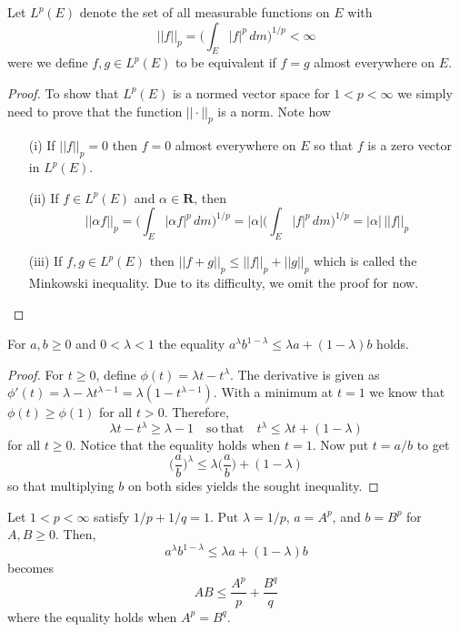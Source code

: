 \vspace{2ex}
\begin{cor}
Let $L^{p}(E)$ denote the set of all measurable functions on $E$ with 
\[||f||_{p}=\Big(\int _{E}|f|^{p}\,dm\Big)^{1/p}<\infty \]
were we define $f,g\in L^{p}(E)$ to be equivalent if $f=g$ almost everywhere on $E$. 
\end{cor}
\vspace{2ex}
\begin{proof}
To show that $L^{p}(E)$ is a normed vector space for $1<p<\infty $ we simply need to prove that the function $||\cdot ||_{p}$ is a norm. Note how
\begin{itemize}
\item[(i)] If $||f||_{p}=0$ then $f=0$ almost everywhere on $E$ so that $f$ is a zero vector in $L^{p}(E)$.
\item[(ii)] If $f\in L^{p}(E)$ and $\alpha \in {\bm R}$, then 
\[||\alpha f||_{p}=\Big(\int _{E}|\alpha f|^{p}\,dm\Big)^{1/p}=|\alpha |\Big(\int _{E}|f|^{p}\,dm\Big)^{1/p}=|\alpha |\,||f||_{p}\]
\item[(iii)] If $f,g\in L^{p}(E)$ then $||f+g||_{p}\leq ||f||_{p}+||g||_{p}$ which is called the Minkowski inequality. Due to its difficulty, we omit the proof for now.
\end{itemize}
\end{proof}
\vspace{2ex}
\begin{lem}
For $a,b\geq 0$ and $0<\lambda <1$ the equality $a^{\lambda }b^{1-\lambda }\leq \lambda a+(1-\lambda )b$ holds.
\end{lem}
\vspace{2ex}
\begin{proof}
For $t\geq 0$, define $\phi (t)=\lambda t-t^{\lambda }$. The derivative is given as $\phi '(t)=\lambda -\lambda t^{\lambda -1}=\lambda (1-t^{\lambda -1})$. With a minimum at $t=1$ we know that $\phi (t)\geq \phi (1)$ for all $t>0$. Therefore,
\[\lambda t-t^{\lambda }\geq \lambda -1\quad\mathrm{so\ that}\quad t^{\lambda }\leq \lambda t+(1-\lambda )\]
for all $t\geq 0$. Notice that the equality holds when $t=1$. Now put $t=a/b$ to get 
\[\Big(\dfrac{a}{b}\Big)^{\lambda  }\leq \lambda\Big(\dfrac{a}{b}\Big)+(1-\lambda )\]
so that multiplying $b$ on both sides yields the sought inequality.
\end{proof}
\vspace{2ex}
\begin{cor}
Let $1<p<\infty $ satisfy $1/p+1/q=1$. Put $\lambda =1/p$, $a=A^{p}$, and $b=B^{p}$ for $A,B\geq 0$. Then, 
\[a^{\lambda }b^{1-\lambda }\leq \lambda a+(1-\lambda )b\]
becomes
\[AB\leq \dfrac{A^{p}}{p}+\dfrac{B^{q}}{q}\]
where the equality holds when $A^{p}=B^{q}$.
\end{cor}
